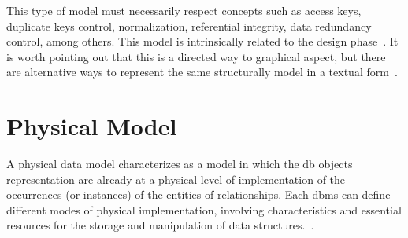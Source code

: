 This type of model must necessarily respect concepts such as access keys, duplicate keys control, normalization, referential integrity, data redundancy control, among others.
This model is intrinsically related to the design phase~\cite{Cougo:2013}.
It is worth pointing out that this is a directed way to graphical aspect, but there are alternative ways to represent the same structurally model in a textual form~\cite{Martelli:2018}.

\section{Physical Model}
\label{sec_back:physicalModel}

A physical data model characterizes as a model in which the \ac{db} objects representation are already at a physical level of implementation of the occurrences (or instances) of the entities of relationships.
Each \ac{dbms} can define different modes of physical implementation, involving characteristics and essential resources for the storage and manipulation of data structures.~\cite{Cougo:2013}.

